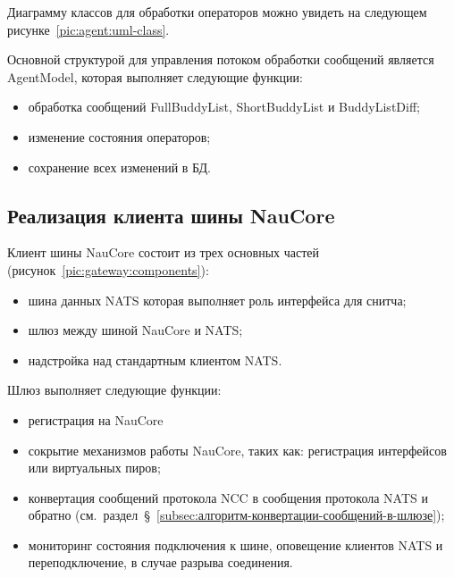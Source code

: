 Диаграмму классов для обработки операторов можно увидеть на следующем рисунке~\ref{pic:agent:uml-class}.


Основной структурой для управления потоком обработки сообщений является AgentModel, которая выполняет следующие функции:
\begin{itemize}
    \item обработка сообщений FullBuddyList, ShortBuddyList и BuddyListDiff;
    \item изменение состояния операторов;
    \item сохранение всех изменений в БД.
\end{itemize}

\subsection{Реализация клиента шины NauCore}\label{subsec:реализация-клиента-шины-naucore}

Клиент шины NauCore состоит из трех основных частей (рисунок~\ref{pic:gateway:components}):
\begin{itemize}
    \item шина данных NATS которая выполняет роль интерфейса для снитча;
    \item шлюз между шиной NauCore и NATS;
    \item надстройка над стандартным клиентом NATS\@.
\end{itemize}


Шлюз выполняет следующие функции:
\begin{itemize}
    \item регистрация на NauCore
    \item сокрытие механизмов работы NauCore, таких как: регистрация интерфейсов или виртуальных пиров;
    \item конвертация сообщений протокола NCC в сообщения протокола NATS и обратно (см.~раздел~\S~\ref{subsec:алгоритм-конвертации-сообщений-в-шлюзе});
    \item мониторинг состояния подключения к шине, оповещение клиентов NATS и переподключение, в случае разрыва соединения.
\end{itemize}


